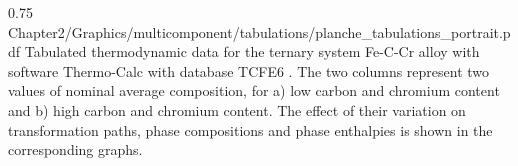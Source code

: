 %
%
\begin{figureth}
{0.75}
{Chapter2/Graphics/multicomponent/tabulations/planche_tabulations_portrait.pdf}
{Tabulated thermodynamic data for the ternary system Fe-C-Cr alloy with software 
Thermo-Calc \citep{andersson_thermo-calc_2002}  with database TCFE6 \citep{tcfe6_tcfe6:_2010}.
The two columns represent two values of nominal average composition, for a) low carbon and chromium content
and b) high carbon and chromium content.
The effect of their variation on transformation paths, phase compositions and phase enthalpies is shown in the corresponding graphs.}
\label{fig:ternary_tabulations}
\end{figureth}
%
